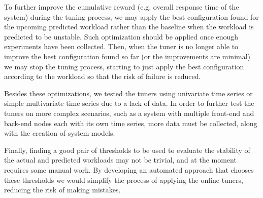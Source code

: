 \documentclass[a4paper, 12pt]{article} %
\begin{document}
	To further improve the cumulative reward (e.g. overall response time of the system) during the tuning process, we may apply the best configuration found for the upcoming predicted workload rather than the baseline when the workload is predicted to be unstable. Such optimization should be applied once enough experiments have been collected. Then, when the tuner is no longer able to improve the best configuration found so far (or the improvements are minimal) we may stop the tuning process, starting to just apply the best configuration according to the workload so that the risk of failure is reduced.
	
	Besides these optimizations, we tested the tuners using univariate time series or simple multivariate time series due to a lack of data. In order to further test the tuners on more complex scenarios, such as a system with multiple front-end and back-end nodes each with its own time series, more data must be collected, along with the creation of system models. 
	
	Finally, finding a good pair of thresholds to be used to evaluate the stability of the actual and predicted workloads may not be trivial, and at the moment requires some manual work. By developing an automated approach that chooses these thresholds we would simplify the process of applying the online tuners, reducing the risk of making mistakes.
	
	\newpage
	 
	
	
	
\end{document}
